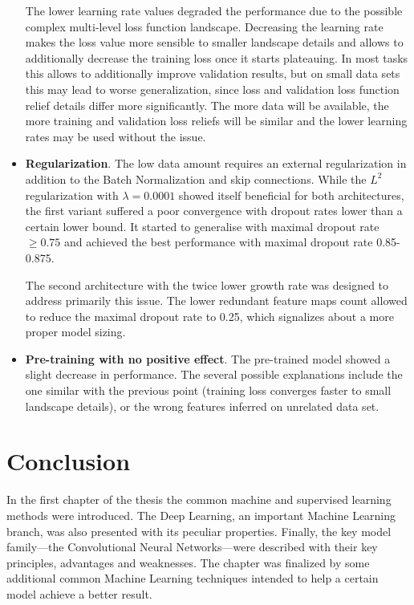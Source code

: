 \documentclass[thesis=B,english]{FITthesis}[2019/12/23]
\begin{document}
\begin{itemize}
	The lower learning rate values degraded the performance due to the possible complex multi-level loss function landscape. Decreasing the learning rate  makes the loss value more sensible to smaller landscape details and allows to additionally decrease the training loss once it starts plateauing. In most tasks this allows to additionally improve validation results, but on small data sets this may lead to worse generalization, since loss and validation loss function relief details differ more significantly. The more data will be available, the more training and validation loss reliefs will be similar and the lower learning rates may be used without the issue.
	
	\item \textbf{Regularization}. The low data amount requires an external regularization in addition to the Batch Normalization and skip connections. While the $L^2$ regularization with $\lambda = 0.0001$ showed itself beneficial for both architectures, the first variant suffered a poor convergence with dropout rates lower than a certain lower bound. It started to generalise with maximal dropout rate $\geq 0.75$ and achieved the best performance with maximal dropout rate 0.85-0.875.
	
	The second architecture with the twice lower growth rate was designed to address primarily this issue. The lower redundant feature maps count allowed to reduce the maximal dropout rate to 0.25, which signalizes about a more proper model sizing.
	
	\item \textbf{Pre-training with no positive effect}. The pre-trained model showed a slight decrease in performance. The several possible explanations include the one similar with the previous point (training loss converges faster to small landscape details), or the wrong features inferred on unrelated data set.
	
\end{itemize}

\chapter{Conclusion}

In the first chapter of the thesis the common machine and supervised learning methods were introduced. The Deep Learning, an important Machine Learning branch, was also presented with its peculiar properties. Finally, the key model family---the Convolutional Neural Networks---were described with their key principles, advantages and weaknesses. The chapter was finalized by some additional common Machine Learning techniques intended to help a certain model achieve a better result.
\end{document}
